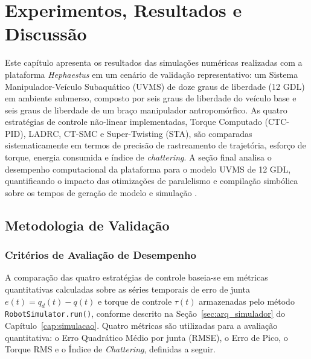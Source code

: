 \chapter{Experimentos, Resultados e Discussão}
\label{cap:experimentos}

Este capítulo apresenta os resultados das simulações numéricas realizadas com a plataforma \textit{Hephaestus} em um cenário de validação representativo: um Sistema Manipulador-Veículo Subaquático (UVMS) de doze graus de liberdade (12 GDL) em ambiente submerso, composto por seis graus de liberdade do veículo base e seis graus de liberdade de um braço manipulador antropomórfico. As quatro estratégias de controle não-linear implementadas, Torque Computado (CTC-PID), LADRC, CT-SMC e Super-Twisting (STA), são comparadas sistematicamente em termos de precisão de rastreamento de trajetória, esforço de torque, energia consumida e índice de \textit{chattering}. A seção final analisa o desempenho computacional da plataforma para o modelo UVMS de 12 GDL, quantificando o impacto das otimizações de paralelismo e compilação simbólica sobre os tempos de geração de modelo e simulação \cite{slotine1991applied, craig1989introduction, gao2003scaling}.

\section{Metodologia de Validação}
\label{sec:metodologia_validacao}

\subsection{Critérios de Avaliação de Desempenho}

A comparação das quatro estratégias de controle baseia-se em métricas quantitativas calculadas sobre as séries temporais de erro de junta $e(t) = q_d(t) - q(t)$ e torque de controle $\tau(t)$ armazenadas pelo método \texttt{RobotSimulator.run()}, conforme descrito na Seção~\ref{sec:arq_simulador} do Capítulo~\ref{cap:simulacao}. Quatro métricas são utilizadas para a avaliação quantitativa: o Erro Quadrático Médio por junta (RMSE), o Erro de Pico, o Torque RMS e o Índice de \textit{Chattering}, definidas a seguir.


